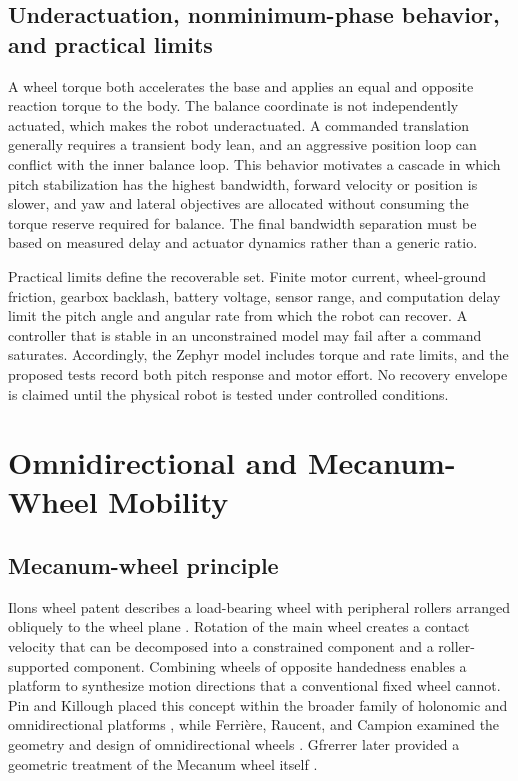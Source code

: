 \subsection{Underactuation, nonminimum-phase behavior, and practical limits}\label{underactuation-nonminimum-phase-behavior-and-practical-limits}

A wheel torque both accelerates the base and applies an equal and
opposite reaction torque to the body. The balance coordinate is not
independently actuated, which makes the robot underactuated. A commanded
translation generally requires a transient body lean, and an aggressive
position loop can conflict with the inner balance loop. This behavior
motivates a cascade in which pitch stabilization has the highest
bandwidth, forward velocity or position is slower, and yaw and lateral
objectives are allocated without consuming the torque reserve required
for balance. The final bandwidth separation must be based on measured
delay and actuator dynamics rather than a generic ratio.

Practical limits define the recoverable set. Finite motor current,
wheel-ground friction, gearbox backlash, battery voltage, sensor range,
and computation delay limit the pitch angle and angular rate from which
the robot can recover. A controller that is stable in an unconstrained
model may fail after a command saturates. Accordingly, the Zephyr model
includes torque and rate limits, and the proposed tests record both
pitch response and motor effort. No recovery envelope is claimed until
the physical robot is tested under controlled conditions.

\section{Omnidirectional and Mecanum-Wheel Mobility}\label{omnidirectional-and-mecanum-wheel-mobility}

\subsection{Mecanum-wheel principle}\label{mecanum-wheel-principle}

Ilon\textquotesingle s wheel patent describes a load-bearing wheel with
peripheral rollers arranged obliquely to the wheel plane \cite{ilon1975mecanum}.
Rotation of the main wheel creates a contact velocity that can be
decomposed into a constrained component and a roller-supported
component. Combining wheels of opposite handedness enables a platform to
synthesize motion directions that a conventional fixed wheel cannot. Pin
and Killough placed this concept within the broader family of holonomic
and omnidirectional platforms \cite{pin1994omnidirectional}, while Ferrière, Raucent, and
Campion examined the geometry and design of omnidirectional wheels
\cite{ferriere1996omnimobile}. Gfrerrer later provided a geometric treatment of the Mecanum
wheel itself \cite{gfrerrer2008geometry}.


